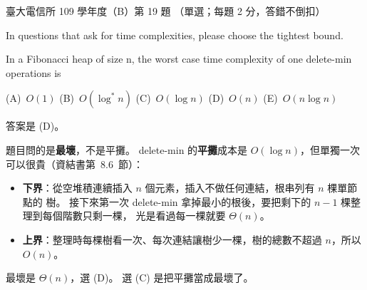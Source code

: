 \begin{pastexam}[label={px:ntu-109-comm-dsa-19}]{臺大電信所 109 學年度（B）第 19 題}
（單選；每題 2 分，答錯不倒扣）

In questions that ask for time complexities, please choose the tightest bound.

In a Fibonacci heap of size n, the worst case time complexity of one delete-min operations is

(A)~$O(1)$ \qquad (B)~$O(\log^* n)$ \qquad (C)~$O(\log n)$ \qquad (D)~$O(n)$ \qquad (E)~$O(n\log n)$
\end{pastexam}

\begin{pastsoln}
答案是 (D)。

題目問的是\textbf{最壞}，不是平攤。 delete-min 的\textbf{平攤}成本是 $O(\log n)$，但單獨一次
可以很貴（資結書第~8.6~節）：
\begin{itemize}
\item \textbf{下界}：從空堆積連續插入 $n$ 個元素，插入不做任何連結，根串列有 $n$ 棵單節點的
樹。 接下來第一次 delete-min 拿掉最小的根後，要把剩下的 $n - 1$ 棵整理到每個階數只剩一棵，
光是看過每一棵就要 $\Theta(n)$。
\item \textbf{上界}：整理時每棵樹看一次、每次連結讓樹少一棵，樹的總數不超過 $n$，所以
$O(n)$。
\end{itemize}
最壞是 $\Theta(n)$，選 (D)。 選 (C) 是把平攤當成最壞了。
\end{pastsoln}
